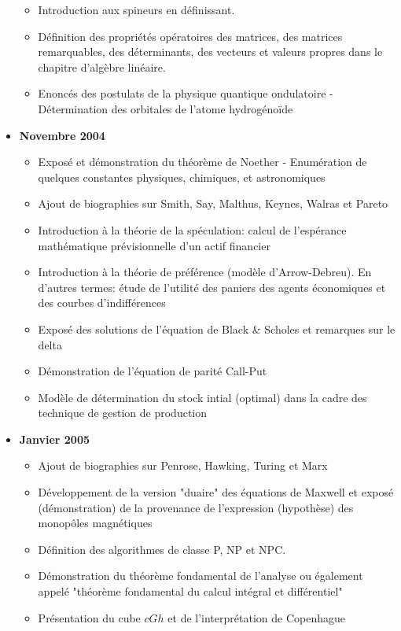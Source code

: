 \documentclass[12pt,a4paper,twoside,openright]{report}
\theoremstyle{definition}
\theoremstyle{itexmp}
\numberwithin{equation}{section}
\begin{document}
\begin{itemize}
\begin{itemize}[noitemsep]
				\item Introduction aux spineurs en définissant.
				\item Définition des propriétés opératoires des matrices, des matrices remarquables, des déterminants, des vecteurs et valeurs propres dans le chapitre d'algèbre linéaire. 
				\item Enoncés des postulats de la physique quantique ondulatoire
- Détermination des orbitales de l'atome hydrogénoïde
			\end{itemize}
		\item \textbf{Novembre 2004}
			\begin{itemize}[noitemsep]
				\item Exposé et démonstration du théorème de Noether
- Enumération de quelques constantes physiques, chimiques, et astronomiques
				\item Ajout de biographies sur Smith, Say, Malthus, Keynes, Walras et Pareto
				\item Introduction à la théorie de la spéculation: calcul de l'espérance mathématique prévisionnelle d'un actif financier
				\item Introduction à la théorie de préférence (modèle d'Arrow-Debreu). En d'autres termes: étude de l'utilité des paniers des agents économiques et des courbes d'indifférences
				\item Exposé des solutions de l'équation de Black \& Scholes et remarques sur le delta
				\item Démonstration de l'équation de parité Call-Put
				\item Modèle de détermination du stock intial (optimal) dans la cadre des technique de gestion de production 
			\end{itemize}
		\item \textbf{Janvier 2005}
			\begin{itemize}[noitemsep]
				\item Ajout de biographies sur Penrose, Hawking, Turing et Marx
				\item Développement de la version "duaire" des équations de Maxwell et exposé (démonstration) de la provenance de l'expression (hypothèse) des monopôles magnétiques
				\item Définition des algorithmes de classe P, NP et NPC.
				\item Démonstration du théorème fondamental de l'analyse ou également appelé "théorème fondamental du calcul intégral et différentiel"
				\item Présentation du cube $cGh$ et de l'interprétation de Copenhague

\end{itemize}
\end{itemize}
\end{document}
